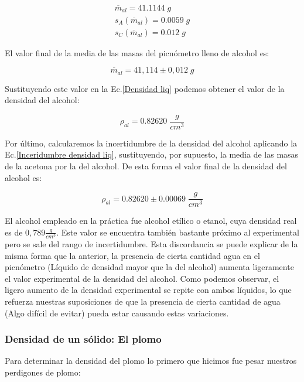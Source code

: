 \documentclass[a4paper,12pt,titlepage]{report}
\begin{document}
\begin{gather}
    \overline{m}_{al} = 41.1144 \; g\\
    s_{A}(\overline{m}_{al}) = 0.0059 \; g\\
    s_{C}(\overline{m}_{al}) = 0.012 \; g
\end{gather}

El valor final de la media de las masas del picnómetro lleno de alcohol es:

\begin{equation}
    \overline{m}_{al} = 41,114 \pm 0,012 \; g
\end{equation}

Sustituyendo este valor en la Ec.\ref{Densidad liq} podemos obtener el valor de la densidad del alcohol:

\begin{equation}
    \rho_{al}  = 0.82620 \; \frac{g}{cm^3}
\end{equation}

Por último, calcularemos la incertidumbre de la densidad del alcohol aplicando la Ec.\ref{Inceridumbre densidad liq}, sustituyendo, por supuesto, la media de las masas de la acetona por la del alcohol. De esta forma el valor final de la densidad del alcohol es:

\begin{equation}
    \rho_{al} = 0.82620 \pm 0.00069 \; \frac{g}{cm^3}
\end{equation}

El alcohol empleado en la práctica fue alcohol etílico o etanol, cuya densidad real es de $0,789 \frac{g}{cm^3}$. Este valor se encuentra también bastante próximo al experimental pero se sale del rango de incertidumbre. Esta discordancia se puede explicar de la misma forma que la anterior, la presencia de cierta cantidad agua en el picnómetro (Líquido de densidad mayor que la del alcohol) aumenta ligeramente el valor experimental de la densidad del alcohol. Como podemos observar, el ligero aumento de la densidad experimental se repite con ambos líquidos, lo que refuerza nuestras suposiciones de que la presencia de cierta cantidad de agua (Algo difícil de evitar) pueda estar causando estas variaciones.


\subsubsection{Densidad de un sólido: El plomo}

Para determinar la densidad del plomo lo primero que hicimos fue pesar nuestros perdigones de plomo:
\end{document}
